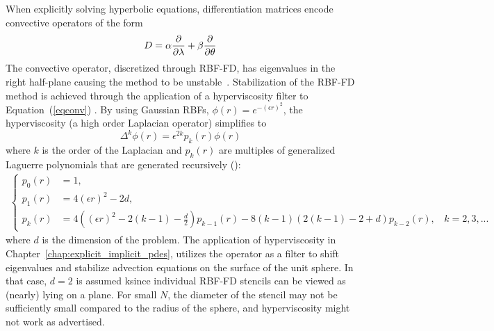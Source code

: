 \documentclass[11pt]{report}
\begin{document}
{When explicitly solving hyperbolic equations, differentiation matrices encode convective operators of the form 
\begin{equation}
D = \alpha \frac{\partial }{\partial \lambda} + \beta \frac{\partial }{\partial \theta} \label{eqconv}
\end{equation}
The convective operator, discretized
through RBF-FD, has eigenvalues  
 in the right half-plane causing the method to be unstable~\cite{FornbergLehto11, FlyerLehto11}.  
Stabilization of the RBF-FD method is achieved through the application of a hyperviscosity filter 
to Equation~(\ref{eqconv}) \cite{FornbergLehto11}. By using Gaussian 
 RBFs, $\phi(r) = e^{-(\epsilon r)^2}$, the hyperviscosity (a high order Laplacian operator) simplifies to
\begin{equation}
\Delta^{k}\phi(r) = \epsilon^{2k} p_k(r) \phi(r)
\label{eqn:gaussian_hv}
\end{equation}
where $k$ is the order of the Laplacian and  $p_k(r)$ are multiples of generalized Laguerre polynomials that
are generated recursively (\cite{FornbergLehto11}):
\begin{align*}
\begin{cases} 
p_0(r) &=1, \\
p_1(r) &= 4(\epsilon r)^2 - 2d, \\
p_k(r) &= 4((\epsilon r)^2 - 2(k-1) - \frac{d}{2})  p_{k-1}(r) - 8(k-1)(2(k-1) - 2 + d) p_{k-2}(r), \ \ \ \ k = 2, 3, ...
\end{cases}
\end{align*}
where $d$ is the dimension of the problem. The application of hyperviscosity in Chapter~\ref{chap:explicit_implicit_pdes}, utilizes the operator as a filter to shift eigenvalues and stabilize advection equations on the surface of the unit sphere. In that case, $d=2$ is assumed ksince individual RBF-FD stencils can be viewed as (nearly) lying on a plane. For small $N$, the diameter of the stencil may not be sufficiently 
small compared to the radius of the sphere, and hyperviscosity might not work as advertised. 

}
\end{document}
